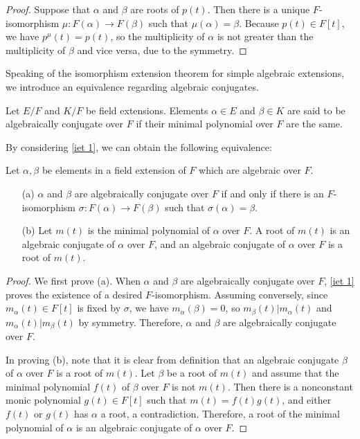 \begin{proof}
    Suppose that $\alpha$ and $\beta$ are roots of $p(t)$.
    Then there is a unique $F$-isomorphism $\mu: F(\alpha)\rightarrow F(\beta)$ such that $\mu(\alpha)=\beta$.
    Because $p(t)\in F[t]$, we have $p^\mu(t)=p(t)$, so the multiplicity of $\alpha$ is not greater than the multiplicity of $\beta$ and vice versa, due to the symmetry.
\end{proof}
Speaking of the isomorphism extension theorem for simple algebraic extensions, we introduce an equivalence regarding algebraic conjugates.
\begin{defi}
    Let $E/F$ and $K/F$ be field extensions.
    Elements $\alpha\in E$ and $\beta\in K$ are said to be algebraically conjugate over $F$ if their minimal polynomial over $F$ are the same.
\end{defi}
By considering \cref{iet 1}, we can obtain the following equivalence:
\begin{obs}
    Let $\alpha, \beta$ be elements in a field extension of $F$ which are algebraic over $F$.
    \begin{enumerate}
        \item[(a)]
        {
            $\alpha$ and $\beta$ are algebraically conjugate over $F$ if and only if there is an $F$-isomorphism $\sigma: F(\alpha)\rightarrow F(\beta)$ such that $\sigma(\alpha)=\beta$.        
        }
        \item[(b)]
        {
            Let $m(t)$ is the minimal polynomial of $\alpha$ over $F$.
            A root of $m(t)$ is an algebraic conjugate of $\alpha$ over $F$, and an algebraic conjugate of $\alpha$ over $F$ is a root of $m(t)$.
        }
    \end{enumerate}
\end{obs}
\begin{proof}
    We first prove (a).
    When $\alpha$ and $\beta$ are algebraically conjugate over $F$, \cref{iet 1} proves the existence of a desired $F$-isomorphism.
    Assuming conversely, since $m_\alpha(t)\in F[t]$ is fixed by $\sigma$, we have $m_\alpha(\beta)=0$, so $m_\beta(t)|m_\alpha(t)$ and $m_\alpha(t)|m_\beta(t)$ by symmetry.
    Therefore, $\alpha$ and $\beta$ are algebraically conjugate over $F$.

    In proving (b), note that it is clear from definition that an algebraic conjugate $\beta$ of $\alpha$ over $F$ is a root of $m(t)$.
    Let $\beta$ be a root of $m(t)$ and assume that the minimal polynomial $f(t)$ of $\beta$ over $F$ is not $m(t)$.
    Then there is a nonconstant monic polynomial $g(t)\in F[t]$ such that $m(t)=f(t)g(t)$, and either $f(t)$ or $g(t)$ has $\alpha$ a root, a contradiction.
    Therefore, a root of the minimal polynomial of $\alpha$ is an algebraic conjugate of $\alpha$ over $F$.
\end{proof}
